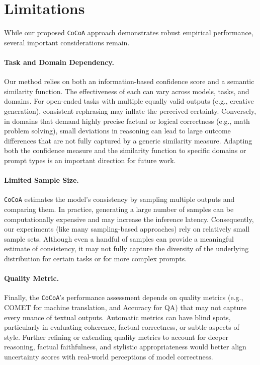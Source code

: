
\section{Limitations}

While our proposed \texttt{CoCoA} approach demonstrates robust empirical performance, several important considerations remain.

\paragraph{Task and Domain Dependency.}
  Our method relies on both an information-based confidence score and a semantic similarity function. The effectiveness of each can vary across models, tasks, and domains. For open-ended tasks with multiple equally valid outputs (e.g., creative generation), consistent rephrasing may inflate the perceived certainty. Conversely, in domains that demand highly precise factual or logical correctness (e.g., math problem solving), small deviations in reasoning can lead to large outcome differences that are not fully captured by a generic similarity measure. Adapting both the confidence measure and the similarity function to specific domains or prompt types is an important direction for future work.

\paragraph{Limited Sample Size.}
  \texttt{CoCoA} estimates the model's consistency by sampling multiple outputs and comparing them. In practice, generating a large number of samples can be computationally expensive and may increase the inference latency. Consequently, our experiments (like many sampling-based approaches) rely on relatively small sample sets. Although even a handful of samples can provide a meaningful estimate of consistency, it may not fully capture the diversity of the underlying distribution for certain tasks or for more complex prompts.

\paragraph{Quality Metric.}
  Finally, the \texttt{CoCoA}'s performance assessment depends on quality metrics (e.g., COMET for machine translation, and Accuracy for QA) that may not capture every nuance of textual outputs. Automatic metrics can have blind spots, particularly in evaluating coherence, factual correctness, or subtle aspects of style. Further refining or extending quality metrics to account for deeper reasoning, factual faithfulness, and stylistic appropriateness would better align uncertainty scores with real-world perceptions of model correctness.
